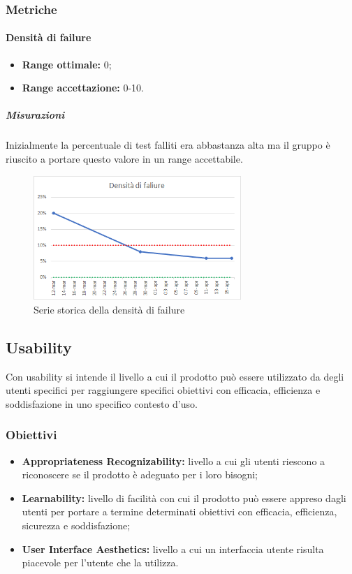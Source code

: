 		\subsubsection{Metriche}
			\paragraph{Densità di failure} \Spazio
			\begin{itemize}
				\item {\textbf{Range ottimale:} 0;}
				\item {\textbf{Range accettazione:} 0-10.}
			\end{itemize}
		      \subparagraph{Misurazioni}
		       Inizialmente la percentuale di test falliti era abbastanza alta ma il gruppo è riuscito a portare questo valore in un range accettabile.
		     \begin{figure}[H]
		     	\centering 
		     	\includegraphics[width=0.7\textwidth]{Images/fail.png}
		     	\caption{Serie storica della densità di failure}
		     	\label{fail} 
		     \end{figure} 
	        
			
	\subsection{Usability}
		Con usability si intende il livello a cui il prodotto può essere utilizzato da degli utenti specifici per raggiungere specifici obiettivi con efficacia, efficienza e soddisfazione in uno specifico contesto d'uso.  
		\subsubsection{Obiettivi}
		\begin{itemize}
			\item {\textbf{Appropriateness Recognizability:} livello a cui gli utenti riescono a riconoscere se il prodotto è adeguato per i loro bisogni;}
			\item {\textbf{Learnability:} livello di facilità con cui il prodotto può essere appreso dagli utenti per portare a termine determinati obiettivi con efficacia, efficienza, sicurezza e soddisfazione;} 
			\item {\textbf{User Interface Aesthetics:} livello a cui un interfaccia utente risulta piacevole per l'utente che la utilizza. }
			
		\end{itemize}
